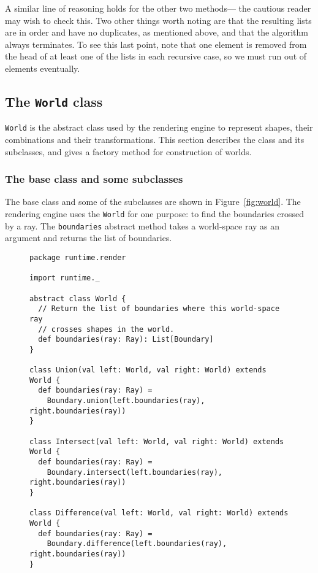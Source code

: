 A similar line of reasoning holds for the other two methods---%
the cautious reader may wish to check this.
Two other things worth noting are that
the resulting lists are in order and have no duplicates,
as mentioned above,
and that the algorithm always terminates.
To see this last point,
note that one element is removed from the head of at least one of the lists
in each recursive case,
so we must run out of elements eventually.

\subsection{The \texttt{World} class\label{sec:world}}

\verb!World! is the abstract class used by the rendering engine
to represent shapes, their combinations and their transformations.
This section describes the class and its subclasses,
and gives a factory method for construction of worlds.

\subsubsection{The base class and some subclasses\label{sec:worldbase}}

The base class and some of the subclasses are shown in Figure~\ref{fig:world}.
The rendering engine uses the \verb!World! for one purpose:
to find the boundaries crossed by a ray.
The \verb!boundaries! abstract method takes a world-space ray as an argument
and returns the list of boundaries.

\begin{figure}
\begin{verbatim}
package runtime.render

import runtime._

abstract class World {
  // Return the list of boundaries where this world-space ray
  // crosses shapes in the world.
  def boundaries(ray: Ray): List[Boundary]
}

class Union(val left: World, val right: World) extends World {
  def boundaries(ray: Ray) =
    Boundary.union(left.boundaries(ray), right.boundaries(ray))
}

class Intersect(val left: World, val right: World) extends World {
  def boundaries(ray: Ray) =
    Boundary.intersect(left.boundaries(ray), right.boundaries(ray))
}

class Difference(val left: World, val right: World) extends World {
  def boundaries(ray: Ray) =
    Boundary.difference(left.boundaries(ray), right.boundaries(ray))
}
\end{verbatim}
\getcaption
\end{figure}

